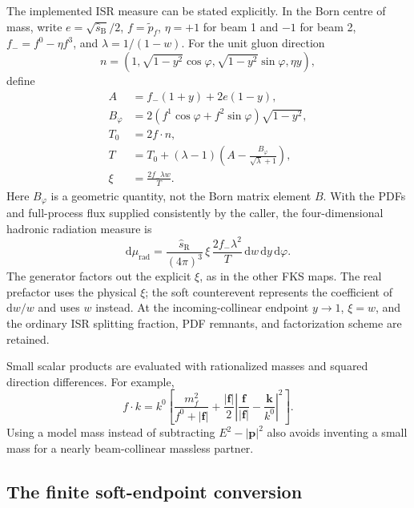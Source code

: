 \documentclass[11pt,a4paper]{article}
\newcommand{\dd}{\mathrm{d}}
\begin{document}
The implemented ISR measure can be stated explicitly. In the Born centre of
mass, write $e=\sqrt{\hat s_{\mathrm B}}/2$,
$f=\widetilde p_f$, $\eta=+1$ for beam 1 and $-1$ for beam 2,
$f_-=f^0-\eta f^3$, and $\lambda=1/(1-w)$. For the unit gluon direction
\begin{equation}
 n=(1,\sqrt{1-y^2}\cos\varphi,
        \sqrt{1-y^2}\sin\varphi,\eta y),
\end{equation}
define
\begin{align}
 A&=f_-(1+y)+2e(1-y),\\
 B_\varphi&=2(f^1\cos\varphi+f^2\sin\varphi)\sqrt{1-y^2},\\
 T_0&=2f\cdot n,\\
 T&=T_0+(\lambda-1)
             \left(A-\frac{B_\varphi}{\sqrt\lambda+1}\right),\\
 \xi&=\frac{2f_-\lambda w}{T}.
\end{align}
Here $B_\varphi$ is a geometric quantity, not the Born matrix element $B$.
With the PDFs and full-process flux supplied consistently by the caller,
the four-dimensional hadronic radiation measure is
\begin{equation}
 \dd\mu_{\mathrm{rad}}=
 \frac{\hat s_{\mathrm R}}{(4\pi)^3}\,
 \xi\,\frac{2f_-\lambda^2}{T}\,
 \dd w\,\dd y\,\dd\varphi.\label{eq:isrmeasure}
\end{equation}
The generator factors out the explicit $\xi$, as in the other FKS maps.
The real prefactor uses the physical $\xi$; the soft counterevent represents
the coefficient of $\dd w/w$ and uses $w$ instead. At the incoming-collinear
endpoint $y\to1$, $\xi=w$, and the ordinary ISR splitting fraction, PDF
remnants, and factorization scheme are retained.

Small scalar products are evaluated with rationalized masses and squared
direction differences. For example,
\begin{equation}
 f\cdot k=k^0\left[
 \frac{m_f^2}{f^0+|\boldsymbol f|}
 +\frac{|\boldsymbol f|}{2}
 \left|\frac{\boldsymbol f}{|\boldsymbol f|}
       -\frac{\boldsymbol k}{k^0}\right|^2\right].
\end{equation}
Using a model mass instead of subtracting $E^2-|\boldsymbol p|^2$ also avoids
inventing a small mass for a nearly beam-collinear massless partner.

\subsection{The finite soft-endpoint conversion}
\end{document}
